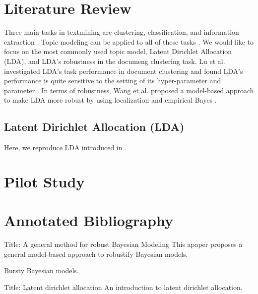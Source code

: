 \documentclass{article}
\begin{document}
\section{Literature Review}

Three main tasks in textmining are clustering, classification, and information extraction \cite{allahyari2017brief}. Topic modeling can be applied to all of these tasks \cite{lu2011investigating}. We would like to focus on the most commonly used topic model, Latent Dirichlet Allocation (LDA), and LDA's robustness in the documeng clustering task. Lu et al. investigated LDA's task performance in document clustering and found LDA's performance is quite sensitive to the setting of its hyper-parameter and parameter \cite{lu2011investigating}. In terms of robustness, Wang et al. proposed a model-based approach to make LDA more robust by using localization and empirical Bayes \cite{wang2018general}.


\subsection{Latent Dirichlet Allocation (LDA)}

Here, we reproduce LDA introduced in \cite{wang2018general}.





\section{Pilot Study}


\section{Annotated Bibliography}
\cite{wang2018general}
Title: A general method for robust Bayesian Modeling
This apaper proposes a general model-based approach to robustify Bayesian models.

\cite{doyle2009accounting}
Bursty Bayesian models.

\cite{blei2003latent}
Title: Latent dirichlet allocation
An introduction to latent dirichlet allocation.




\end{document}
